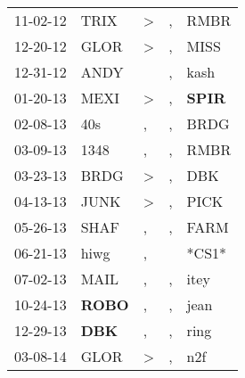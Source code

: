 \begin{supertabular}{p{0.07\textwidth}p{0.06\textwidth}p{0.02\textwidth}p{0.02\textwidth}p{0.06\textwidth}}
          11-02-12\textsuperscript{} &           TRIX\textsuperscript{} &     \textgreater &                , &           RMBR\textsuperscript{} \\
          12-20-12\textsuperscript{} &           GLOR\textsuperscript{} &     \textgreater &                , &           MISS\textsuperscript{} \\
          12-31-12\textsuperscript{} &           ANDY\textsuperscript{} &                  &                , &           kash\textsuperscript{} \\
          01-20-13\textsuperscript{} &           MEXI\textsuperscript{} &     \textgreater &                , &  \textbf{SPIR\textsuperscript{}} \\
          02-08-13\textsuperscript{} &            40s\textsuperscript{} &                , &                , &           BRDG\textsuperscript{} \\
          03-09-13\textsuperscript{} &           1348\textsuperscript{} &                , &                , &           RMBR\textsuperscript{} \\
          03-23-13\textsuperscript{} &           BRDG\textsuperscript{} &     \textgreater &                , &            DBK\textsuperscript{} \\
          04-13-13\textsuperscript{} &           JUNK\textsuperscript{} &     \textgreater &                , &           PICK\textsuperscript{} \\
          05-26-13\textsuperscript{} &           SHAF\textsuperscript{} &                , &                , &           FARM\textsuperscript{} \\
          06-21-13\textsuperscript{} &           hiwg\textsuperscript{} &                , &                  &                            *CS1* \\
          07-02-13\textsuperscript{} &           MAIL\textsuperscript{} &                , &                , &           itey\textsuperscript{} \\
          10-24-13\textsuperscript{} &  \textbf{ROBO\textsuperscript{}} &                , &                , &           jean\textsuperscript{} \\
          12-29-13\textsuperscript{} &   \textbf{DBK\textsuperscript{}} &                , &                , &           ring\textsuperscript{} \\
          03-08-14\textsuperscript{} &           GLOR\textsuperscript{} &     \textgreater &                , &            n2f\textsuperscript{} \\

\end{supertabular}
